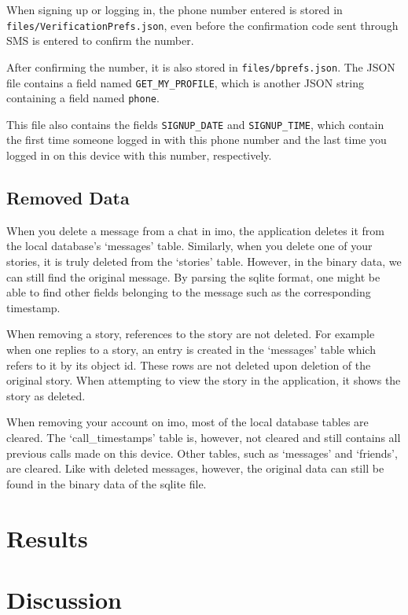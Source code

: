 \documentclass[conference]{IEEEtran}
\begin{document}
When signing up or logging in, the phone number entered is stored in
\texttt{files/VerificationPrefs.json}, even before the confirmation code sent
through SMS is entered to confirm the number.

After confirming the number, it is also stored in \texttt{files/bprefs.json}.
The JSON file contains a field named \texttt{GET\_MY\_PROFILE}, which is another
JSON string containing a field named \texttt{phone}.

This file also contains the fields \texttt{SIGNUP\_DATE} and
\texttt{SIGNUP\_TIME}, which contain the first time someone logged in with this
phone number and the last time you logged in on this device with this number,
respectively.


\subsection{Removed Data}

When you delete a message from a chat in imo, the application deletes it from
the local database's `messages' table. Similarly, when you delete one of your
stories, it is truly deleted from the `stories' table. However, in the binary
data, we can still find the original message. By parsing the sqlite format, one
might be able to find other fields belonging to the message such as the
corresponding timestamp.

When removing a story, references to the story are not deleted. For example
when one replies to a story, an entry is created in the `messages' table which
refers to it by its object id. These rows are not deleted upon deletion of the
original story. When attempting to view the story in the application, it shows
the story as deleted.

When removing your account on imo, most of the local database tables are
cleared. The `call\_timestamps' table is, however, not cleared and still
contains all previous calls made on this device. Other tables, such as
`messages' and `friends', are cleared. Like with deleted messages, however, the
original data can still be found in the binary data of the sqlite file.

\section{Results}\label{sec:results}

\section{Discussion}\label{sec:disc}
\end{document}
